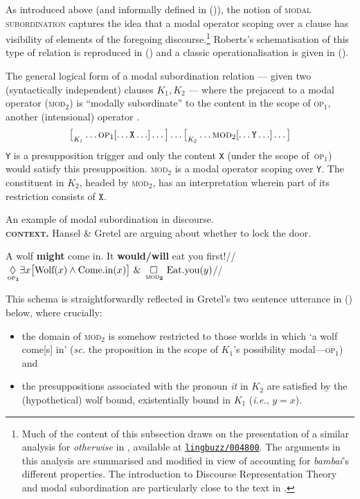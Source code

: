 As introduced above (and informally defined in (\lastx)), the notion of \textsc{modal subordination} captures the idea that a modal operator scoping over a clause has visibility of elements of the foregoing discourse.\footnote{Much of the content of this subsection draws on the presentation of a similar analysis for \textit{otherwise} in \citet{PhilKotek2018,PhilKotek}, available at \href{https://ling.auf.net/lingbuzz/004800}{\texttt{lingbuzz/004800}}. The arguments in this analysis are summarised and modified in view of accounting for \textit{bambai}'s different properties. The introduction to Discourse Representation Theory and modal subordination are particularly close to the text in \citeyear[§4]{PhilKotek}.} Roberts's schematisation of this type of relation is reproduced in () and a classic operationalisation is given in ().

\pex[labeltype=numeric,everylabel=\small] The general logical form of a modal subordination relation --- given two (syntactically independent) clauses $ \mathit{K_1,K_2} $ --- where the prejacent to a modal operator (\textsc{mod}$ _2 $) is ``modally subordinate'' to the content in the scope of \textsc{op}$ _1 $, another (intensional) operator \citep{Roberts2020}.
 $$ \big[_{\mathit{K_1}}\hdots \textsc{op}_1[\hdots \mathtt{X}\hdots]\hdots\big]\hdots\big[_{\mathit{K_2}}\hdots\textsc{mod}_2[\hdots\mathtt{Y}\hdots]\hdots\big] $$
\a\texttt{Y} is a presupposition trigger and only the content \texttt{X} (under the scope of~\textsc{op}$ _1 $) would satisfy this presupposition.
\a \textsc{mod}$ _{2} $ is a modal operator scoping over \texttt{Y}.
\a The constituent in $\mathit{K_2} $, headed by \textsc{mod}$ _2 $, has an interpretation wherein part of its restriction consists of $ \mathtt{X} $.
\xe


\pex[everylabel=\bf\sc] An example of modal subordination in discourse.\\
\textbf{\textsc{context.}} Hansel \& Gretel are arguing about whether to lock the door.

\a[label=g] \begingl\gla A wolf \textbf{might} come in. It \textbf{would/will} eat you first!//
\glft $ \boldsymbol{\underset{\,\textsc{op}_1}{\lozenge}}\exists x\big[\text{Wolf}(x)\wedge\text{Come.in}(x)\big]\ \&\ \boldsymbol{\underset{\,\textsc{mod}_2}{\square}}\ \text{Eat.you}(y) $//\endgl
\xe


\noindent This schema is straightforwardly reflected in Gretel's two sentence utterance in () below, where crucially:\begin{itemize} \item the domain of \textsc{mod}$ _2 $ is somehow restricted to those worlds in which `a wolf come[s] in' (\textit{sc.} the proposition in the scope of $ \mathit{K_1} $'s possibility modal---\textsc{op}$ _{1} $) and \item the presuppositions associated with the pronoun \textit{it} in $ \mathit{K_2} $ are satisfied by the (hypothetical) wolf bound, existentially bound in $ \mathit{K_1} $ (\textit{i.e.}, $ y=x $).\end{itemize}

